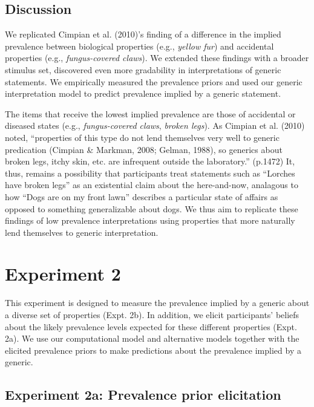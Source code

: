 \documentclass[floatsintext,man]{apa6}
\theoremstyle{definition}
\theoremstyle{definition}
\theoremstyle{definition}
\theoremstyle{remark}
\begin{document}
\subsection{Discussion}\label{discussion}

We replicated Cimpian et al. (2010)'s finding of a difference in the
implied prevalence between biological properties (e.g., \emph{yellow
fur}) and accidental properties (e.g., \emph{fungus-covered claws}). We
extended these findings with a broader stimulus set, discovered even
more gradability in interpretations of generic statements. We
empirically measured the prevalence priors and used our generic
interpretation model to predict prevalence implied by a generic
statement.

The items that receive the lowest implied prevalence are those of
accidental or diseased states (e.g., \emph{fungus-covered claws},
\emph{broken legs}). As Cimpian et al. (2010) noted, \enquote{properties
of this type do not lend themselves very well to generic predication
(Cimpian \& Markman, 2008; Gelman, 1988), so generics about broken legs,
itchy skin, etc. are infrequent outside the laboratory.} (p.1472) It,
thus, remains a possibility that participants treat statements such as
\enquote{Lorches have broken legs} as an existential claim about the
here-and-now, analagous to how \enquote{Dogs are on my front lawn}
describes a particular state of affairs as opposed to something
generalizable about dogs. We thus aim to replicate these findings of low
prevalence interpretations using properties that more naturally lend
themselves to generic interpretation.

\section{Experiment 2}\label{experiment-2}

This experiment is designed to measure the prevalence implied by a
generic about a diverse set of properties (Expt. 2b). In addition, we
elicit participants' beliefs about the likely prevalence levels expected
for these different properties (Expt. 2a). We use our computational
model and alternative models together with the elicited prevalence
priors to make predictions about the prevalence implied by a generic.

\subsection{Experiment 2a: Prevalence prior
elicitation}\label{experiment-2a-prevalence-prior-elicitation}
\end{document}
